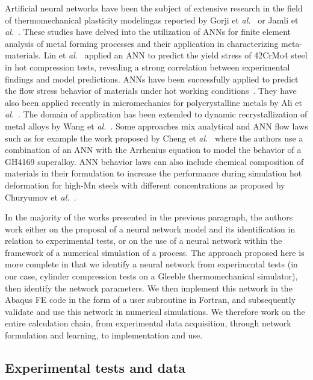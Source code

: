 \documentclass[algorithms,article,submit,pdftex,oneauthors]{Definitions/mdpi}
\makeatletter
\DeclareRobustCommand{\eal}{et \emph{al.}\@\xspace}
\makeatother
\begin{document}
Artificial neural networks have been the subject of extensive research in the field of thermomechanical plasticity modelingas reported by Gorji \eal~\cite{Gorji-2020} or Jamli \eal~\cite{Jamli-2019-SNN}.
These studies have delved into the utilization of ANNs for finite element analysis of metal forming processes and their application in characterizing meta-materials.
Lin \eal~\cite{Lin-2008} applied an ANN to predict the yield stress of 42CrMo4 steel in hot compression tests, revealing a strong correlation between experimental findings and model predictions.
ANNs have been successfully applied to predict the flow stress behavior of materials under hot working conditions~\cite{Stoffel-2018-ANN, Stoffel-2019-NNB}.
They have also been applied recently in micromechanics for polycrystalline metals by Ali \eal~\cite{Ali-2019-AAN}.
The domain of application has been extended to dynamic recrystallization of metal alloys by Wang \eal~\cite{Wang-2021-ANN}.
Some approaches mix analytical and ANN flow laws such as for example the work proposed by Cheng \eal~\cite{Cheng-2022-CWD} where the authors use a combination of an ANN with the Arrhenius equation to model the behavior of a GH4169 superalloy.
ANN behavior laws can also include chemical composition of materials in their formulation to increase the performance during simulation hot deformation for high-Mn steels with different concentrations as proposed by Churyumov \eal~\cite{Churyumov-2023-PTS}.

In the majority of the works presented in the previous paragraph, the authors work either on the proposal of a neural network model and its identification in relation to experimental tests, or on the use of a neural network within the framework of a numerical simulation of a process.
The approach proposed here is more complete in that we identify a neural network from experimental tests (in our case, cylinder compression tests on a Gleeble thermomechanical simulator), then identify the network parameters.
We then implement this network in the Abaqus FE code in the form of a user subroutine in Fortran, and subsequently validate and use this network in numerical simulations.
We therefore work on the entire calculation chain, from experimental data acquisition, through network formulation and learning, to implementation and use.

\subsection{Experimental tests and data}\label{subsec:ExpTests}
\end{document}
